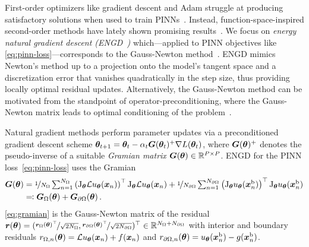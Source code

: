 First-order optimizers like gradient descent and Adam struggle at producing satisfactory solutions when used to train PINNs~\citep{cuomo2022scientific}.
Instead, function-space-inspired second-order methods have lately shown promising results~\citep{muller2024optimization}.
We focus on \emph{energy natural gradient descent (ENGD~\cite{muller2023achieving})} which---applied to PINN objectives like \eqref{eq:pinn-loss}---corresponds to the Gauss-Newton method~\cite[Chapter 6.3][]{bottou2016machine}.
ENGD mimics Newton's method up to a projection onto the model's tangent space and a discretization error that vanishes quadratically in the step size, thus providing locally optimal residual updates.
Alternatively, the Gauss-Newton method can be motivated from the standpoint of operator-preconditioning, where the Gauss-Newton matrix leads to optimal conditioning of the problem~\citep{de2023operator}.

Natural gradient methods perform parameter updates via a preconditioned gradient descent scheme ${\bm{\theta}}_{t+1} = {\bm{\theta}}_t - \alpha_t {\bm{G}}({\bm{\theta}}_t)^+\nabla L({\bm{\theta}}_t)$, where ${\bm{G}}({\bm{\theta}})^+$ denotes the pseudo-inverse of a suitable \emph{Gramian matrix} ${\bm{G}}({\bm{\theta}}) \in {\mathbb{R}}^{P \times P}$.
ENGD for the PINN loss~\eqref{eq:pinn-loss} uses the Gramian
\begin{align}\label{eq:gramian}
  \begin{split}
    {\bm{G}}({\bm{\theta}})
    &=
      \nicefrac{1}{N_\Omega}
      \textstyle
      \sum_{n=1}^{N_\Omega}
      \left( \mathrm{J}_{{\bm{\theta}}} \mathcal{L} u_{\bm{\theta}}({\bm{x}}_n) \right)^\top
      \mathrm{J}_{{\bm{\theta}}} \mathcal{L} u_{\bm{\theta}}({\bm{x}}_n)
      +
      \nicefrac{1}{N_{\partial\Omega}}
      \textstyle
      \sum_{n=1}^{N_{\partial\Omega}}
      \left(\mathrm{J}_{{\bm{\theta}}} u_{\bm{\theta}}({\bm{x}}_n^\text{b})  \right)^\top
      \mathrm{J}_{{\bm{\theta}}} u_{\bm{\theta}} ({\bm{x}}_n^\text{b})
    \\
    &\eqqcolon {\bm{G}}_\Omega({\bm{\theta}}) + {\bm{G}}_{\partial\Omega}({\bm{\theta}})\,.
  \end{split}
\end{align}
\eqref{eq:gramian} is the Gauss-Newton matrix of the residual ${\bm{r}}({\bm{\theta}}) = (\nicefrac{{\bm{r}}_\Omega({\bm{\theta}})^{\top}}{\sqrt{2N_\Omega}}, \nicefrac{{\bm{r}}_{\partial\Omega}({\bm{\theta}})^{\top}}{\sqrt{2N_{\partial\Omega}}} )^\top \in {\mathbb{R}}^{N_{\Omega} + N_{\partial\Omega}}$ with interior and boundary residuals $r_{\Omega,n}({\bm{\theta}}) = \mathcal{L} u_{\bm{\theta}}({\bm{x}}_n) + f({\bm{x}}_n)$ and $r_{\partial\Omega,n}({\bm{\theta}}) = u_{\bm{\theta}}({\bm{x}}_n^\text{b}) - g({\bm{x}}_n^\text{b})$.

